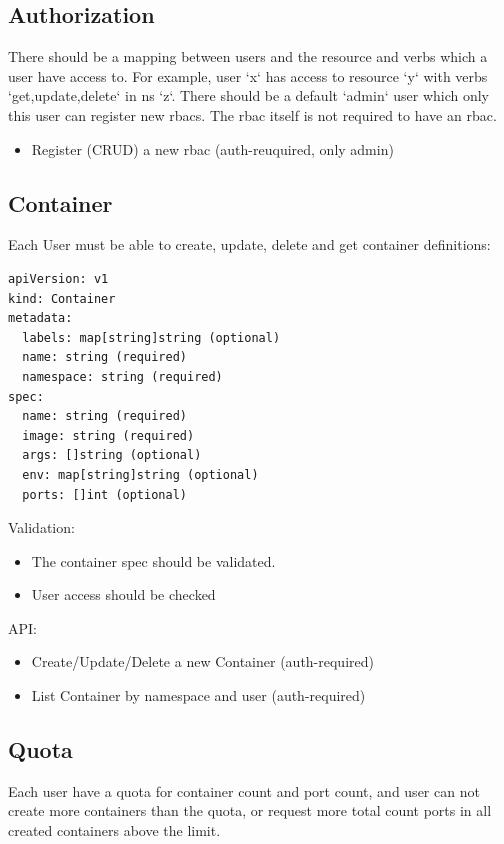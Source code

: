 \documentclass{article}
\begin{document}
\subsection{Authorization}

There should be a mapping between users and the resource and verbs which a user have access to. For example, user `x` has access to resource `y` with verbs `get,update,delete` in ns `z`. There should be a default `admin` user which only this user can register new rbacs. The rbac itself is not required to have an rbac.

\begin{itemize}
  \item Register (CRUD) a new rbac (auth-reuquired, only admin)
\end{itemize}

\subsection{Container}
Each User must be able to create, update, delete and get container definitions:

\begin{verbatim}
apiVersion: v1
kind: Container
metadata:
  labels: map[string]string (optional)
  name: string (required)
  namespace: string (required)
spec:
  name: string (required)
  image: string (required)
  args: []string (optional)
  env: map[string]string (optional)
  ports: []int (optional)
\end{verbatim}

Validation:
\begin{itemize}
  \item The container spec should be validated.
  \item User access should be checked
\end{itemize}

API:
\begin{itemize}
  \item Create/Update/Delete a new Container (auth-required)
  \item List Container by namespace and user (auth-required)
\end{itemize}

\subsection{Quota}

Each user have a quota for container count and port count, and user can not create more containers than the quota, or request more total count ports in all created containers above the limit.
\end{document}

